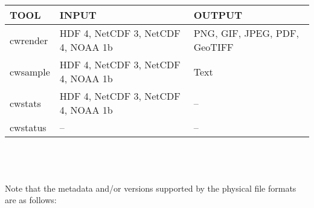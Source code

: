 \begin{tabular}{|l|p{5cm}|p{5cm}|}
  \hline

  TOOL & INPUT & OUTPUT \\ \hline

  cwrender & HDF 4, NetCDF 3, NetCDF 4, NOAA 1b & PNG, GIF, JPEG, PDF,
  GeoTIFF \\ \hline

  cwsample & HDF 4, NetCDF 3, NetCDF 4, NOAA 1b & Text \\ \hline

  cwstats & HDF 4, NetCDF 3, NetCDF 4, NOAA 1b & -- \\ \hline

  cwstatus & -- & -- \\ \hline

\end{tabular} \\
\\
\\
Note that the metadata and/or versions supported by the physical file formats
are as follows: \\
\\
